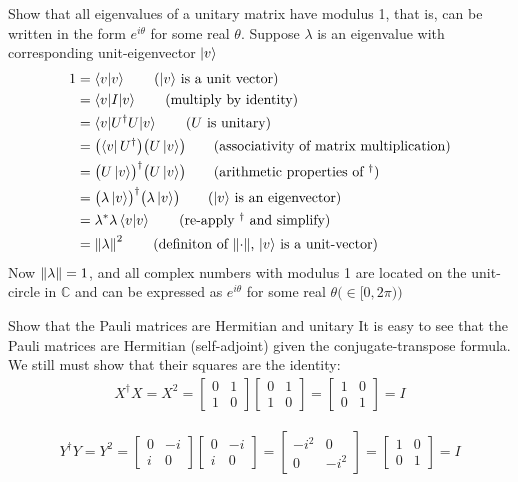  Show that all eigenvalues of a unitary matrix have modulus 1, that is, can be written in the form $e^{i\theta}$ for some real $\theta$.
\Soln
Suppose $\lambda$ is an eigenvalue with corresponding unit-eigenvector $\ket{v}$
\begin{align*}
	1 &= \braket{v | v} \tag{$\ket{v}$ is a unit vector}\\
	&= \braket{v | I | v} \tag{multiply by identity}\\
	&= \braket{v | U^\dagger U  | v} \tag{$U$ is unitary}\\
	&= \bigl(\bra{v}U^\dagger\bigr)\bigl(U\ket{v}\bigr) \tag{associativity of matrix multiplication}\\
	&= \bigl(U\ket{v}\bigr)^\dagger\bigl(U\ket{v}\bigr) \tag{arithmetic properties of $^\dagger$}\\
	&= \bigl(\lambda\ket{v}\bigr)^\dagger\bigl(\lambda\ket{v}\bigr) \tag{$\ket{v}$ is an eigenvector} \\
	&= \lambda^*\lambda\braket{v | v} \tag{re-apply $^\dagger$ and simplify} \\
	&= \norm{\lambda}^2 \tag{definiton of $\norm{\cdot}$, $\ket{v}$ is a unit-vector}
\end{align*}
Now $\left\lVert\lambda\right\rVert = 1$, and all complex numbers with modulus 1 are located on the unit-circle in $\mathbb{C}$ and can be expressed as $e^{i\theta}$ for some real $\theta \bigl(\in[0,2\pi)\bigr)$

 Show that the Pauli matrices are Hermitian and unitary
\Soln
It is easy to see that the Pauli matrices are Hermitian (self-adjoint) given the conjugate-transpose formula.  We still must show that their squares are the identity:
\begin{align*}
	X^\dagger X = X^2 = \begin{bmatrix}
		0 & 1 \\
		1 & 0
	\end{bmatrix}
	\begin{bmatrix}
		0 & 1 \\
		1 & 0
	\end{bmatrix}
	= \begin{bmatrix}
		1 & 0 \\
		0 & 1
	\end{bmatrix} = I
\end{align*}

\begin{align*}
	Y^\dagger Y = Y^2 = \begin{bmatrix}
		0 & -i \\
		i & 0
	\end{bmatrix}
	\begin{bmatrix}
		0 & -i \\
		i & 0
	\end{bmatrix}
	= \begin{bmatrix}
		-i^2 & 0 \\
		0 & -i^2
	\end{bmatrix} 
	= \begin{bmatrix}
		1 & 0 \\
		0 & 1
	\end{bmatrix} = I
\end{align*}

